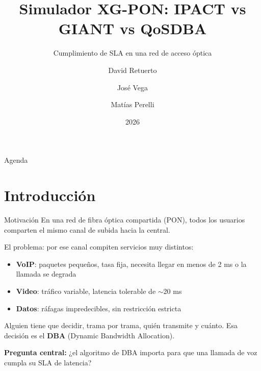 \documentclass[aspectratio=169,t]{beamer}
\title[XG-PON: SLA y DBA]{Simulador XG-PON: IPACT vs GIANT vs QoSDBA}
\subtitle{Cumplimiento de SLA en una red de acceso óptica}
\author[OmneTeam]{David Retuerto \and José Vega \and Matías Perelli}
\institute[UTFSM]{TEL-341 Simulación de Redes\\Universidad Técnica Federico Santa María}
\date{2026}
\begin{document}
\begin{frame}
    \titlepage
\end{frame}

\begin{frame}{Agenda}
    \tableofcontents
\end{frame}

\section{Introducción}

\begin{frame}{Motivación}
    En una red de fibra óptica compartida (PON), todos los usuarios
    comparten el mismo canal de subida hacia la central.

    \vspace{0.2cm}
    El problema: por ese canal compiten servicios muy distintos:
    \begin{itemize}
        \item \textbf{VoIP}: paquetes pequeños, tasa fija, necesita llegar
              en menos de 2 ms o la llamada se degrada
        \item \textbf{Video}: tráfico variable, latencia tolerable de $\sim$20 ms
        \item \textbf{Datos}: ráfagas impredecibles, sin restricción estricta
    \end{itemize}

    \vspace{0.2cm}
    Alguien tiene que decidir, trama por trama, quién transmite y cuánto.
    Esa decisión es el \textbf{DBA} (Dynamic Bandwidth Allocation).

    \vspace{0.2cm}
    \textbf{Pregunta central:} ¿el algoritmo de DBA importa para que una
    llamada de voz cumpla su SLA de latencia?
\end{frame}
\end{document}
